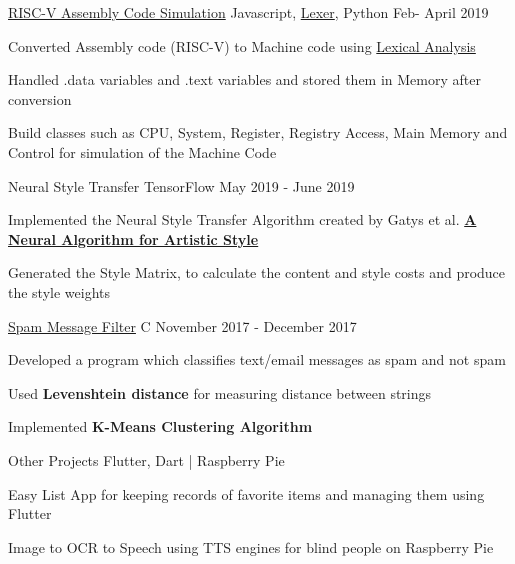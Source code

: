 \begin{cventries}
    \projects
    {} %
    {\href{https://github.com/vinx-2105/assembly-simulator}{RISC-V Assembly Code Simulation}} %
    {Javascript, \href{https://github.com/aaditmshah/lexer}{Lexer}, Python} %
    {Feb- April 2019} %
    {
      \begin{cvitems} %
        \item {Converted Assembly code (RISC-V) to Machine code using \href{https://github.com/aaditmshah/lexer}{Lexical Analysis}}
        \item {Handled .data variables and .text variables and stored them in Memory after conversion}
        \item {Build classes such as CPU, System, Register, Registry Access, Main Memory and Control for simulation of the Machine Code}
      \end{cvitems}
      }
      
      \projects
    {} %
    {{Neural Style Transfer}} %
    {TensorFlow} %
    {May 2019 - June 2019} %
    {
      \begin{cvitems} %
        \item {Implemented the Neural Style Transfer Algorithm created by Gatys et al. \href{https://arxiv.org/abs/1508.06576}{\textbf{A Neural Algorithm for Artistic Style}}}
        \item {Generated the Style Matrix, to calculate the content and style costs and produce the style weights}
      \end{cvitems}
    }
      
      \projects
      {} %
      {\href{https://github.com/parthgoyal123/Queen-McCluskey}{Spam Message Filter}} %
      {C} %
      {November 2017 - December 2017} %
      {
        \begin{cvitems} %
          \item {Developed a program which classifies text/email messages as spam and not spam}
          \item {Used \textbf{Levenshtein distance} for measuring distance between strings} 
          \item {Implemented \textbf{K-Means Clustering Algorithm}}
        \end{cvitems}
        }


  \projects
    {} %
    {{Other Projects}} %
    {Flutter, Dart | Raspberry Pie} %
    {} %
    {
      \begin{cvitems} %
        \item {Easy List App for keeping records of favorite items and managing them using Flutter}
        \item {Image to OCR to Speech using TTS engines for blind people on Raspberry Pie}
      \end{cvitems}
    }


\end{cventries}
